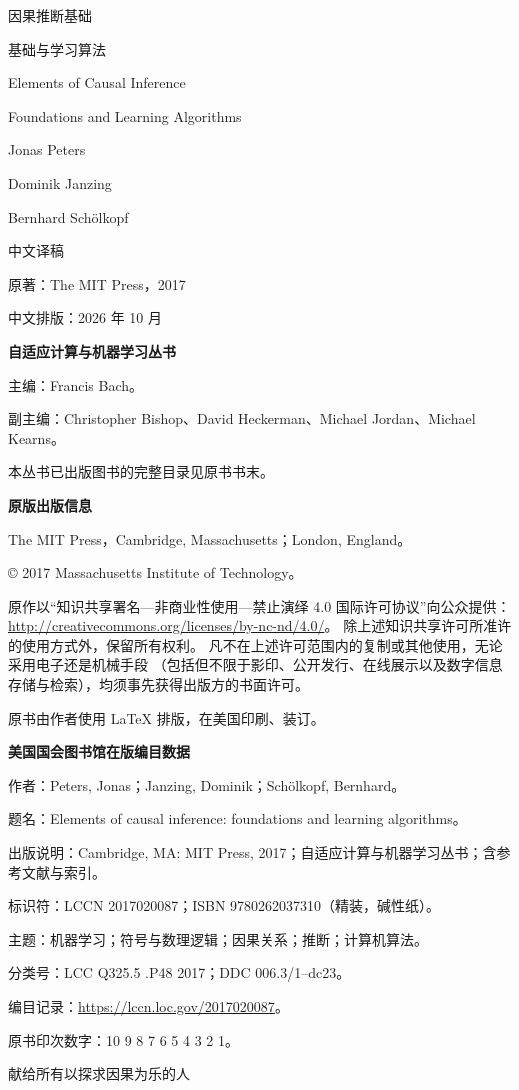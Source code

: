 \begin{titlepage}
\centering
\vspace*{2cm}
{\Huge\heiti 因果推断基础\par}
\vspace{0.7cm}
{\LARGE 基础与学习算法\par}
\vspace{1.3cm}
{\Large Elements of Causal Inference\par}
\vspace{0.3cm}
{\large Foundations and Learning Algorithms\par}
\vspace{1.8cm}
{\large Jonas Peters\par Dominik Janzing\par Bernhard Schölkopf\par}
\vfill
{\large 中文译稿\par}
\vspace{0.5cm}
{原著：The MIT Press，2017\par}
{中文排版：2026 年 10 月\par}
\end{titlepage}

\thispagestyle{empty}
\noindent\textbf{自适应计算与机器学习丛书}\par
主编：Francis Bach。\par
副主编：Christopher Bishop、David Heckerman、Michael Jordan、Michael Kearns。\par
本丛书已出版图书的完整目录见原书书末。

\vspace{1.4cm}
\noindent\textbf{原版出版信息}\par
The MIT Press，Cambridge, Massachusetts；London, England。\par
© 2017 Massachusetts Institute of Technology。

原作以“知识共享署名—非商业性使用—禁止演绎 4.0 国际许可协议”向公众提供：
\url{http://creativecommons.org/licenses/by-nc-nd/4.0/}。
除上述知识共享许可所准许的使用方式外，保留所有权利。
凡不在上述许可范围内的复制或其他使用，无论采用电子还是机械手段
（包括但不限于影印、公开发行、在线展示以及数字信息存储与检索），均须事先获得出版方的书面许可。

原书由作者使用 LaTeX 排版，在美国印刷、装订。

\vspace{0.6cm}
\noindent\textbf{美国国会图书馆在版编目数据}\par
作者：Peters, Jonas；Janzing, Dominik；Schölkopf, Bernhard。\par
题名：Elements of causal inference: foundations and learning algorithms。\par
出版说明：Cambridge, MA: MIT Press, 2017；自适应计算与机器学习丛书；含参考文献与索引。\par
标识符：LCCN 2017020087；ISBN 9780262037310（精装，碱性纸）。\par
主题：机器学习；符号与数理逻辑；因果关系；推断；计算机算法。\par
分类号：LCC Q325.5 .P48 2017；DDC 006.3/1--dc23。\par
编目记录：\url{https://lccn.loc.gov/2017020087}。\par
原书印次数字：10 9 8 7 6 5 4 3 2 1。

\clearpage
\thispagestyle{empty}
\vspace*{5cm}
\begin{center}\Large\kaishu 献给所有以探求因果为乐的人\end{center}
\clearpage
